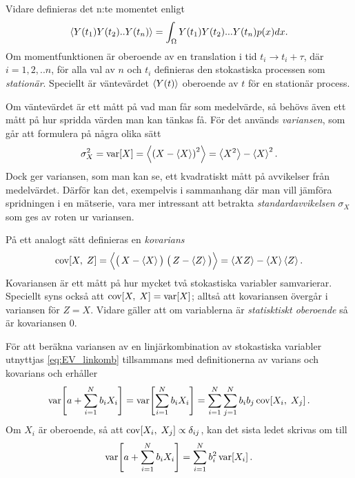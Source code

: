 Vidare definieras det n:te momentet enligt 
\begin{equation}
    \ev{Y(t_1)Y(t_2)..Y(t_n)} = \int_{\Omega} Y(t_1)Y(t_2)...Y(t_n)p(x)dx.
\end{equation}
Om momentfunktionen är oberoende av en translation i tid $t_i\to t_i+\tau$, där $i=1,2,..n$, för alla val av $n$ och $t_i$ definieras den stokastiska processen som \emph{stationär}. Speciellt är väntevärdet $\ev{Y(t)}$ oberoende av $t$ för en stationär process. 

Om väntevärdet är ett mått på vad man får som medelvärde, så behövs
även ett mått på hur spridda värden man kan tänkas få. För det används
\emph{variansen}, som går att formulera på några olika sätt~\cite{Rice_matstat2006}
\begin{equation}\label{eq:VAR}
\sigma_X^2=\VAR{X} = \ev{\left(X-\ev{X} \right)^2} = \ev{X^2}-\ev{X}^2.
\end{equation}
Dock ger variansen, som man kan se, ett kvadratiskt mått på
avvikelser från medelvärdet. Därför kan det, exempelvis i sammanhang
där man vill jämföra spridningen i en mätserie, vara mer intressant
att betrakta \emph{standardavvikelsen} $\sigma_X$ som ges av roten ur
variansen.


På ett analogt sätt definieras en \emph{kovarians}~\cite{Rice_matstat2006}
\begin{equation}\label{eq:COV}
\COV{X}{Z} 
= \Big\langle \big(\, X-\ev{X}\big)\;\big(\, Z-\ev{Z}\big) \Big\rangle
= \ev{XZ}-\ev{X}\ev{Z}.
\end{equation}
Kovariansen är ett mått på hur mycket två stokastiska variabler
samvarierar. Speciellt syns också att $\text{cov}\!\left[X,\;X\right]=\text{var}\!\left[X\right]$; alltså att
kovariansen övergår i variansen för $Z=X$. Vidare gäller att om
variablerna är \emph{statisktiskt oberoende} så är kovariansen 0.

För att beräkna variansen av en linjärkombination av stokastiska variabler utnyttjas \eqref{eq:EV_linkomb} tillsammans med definitionerna av varians och kovarians och erhåller
\begin{equation}
\text{var}\!\left[a+\sum_{i=1}^N b_i X_i\right] = \text{var}\!\left[\sum_{i=1}^N b_i X_i\right] 
= \sum_{i=1}^N\sum_{j=1}^N b_i b_j\, \text{cov}\!\left[X_i,\;X_j\right].
\end{equation}
Om $X_i$ är oberoende, så att $\text{cov}\!\left[X_i,\;X_j\right]\propto\delta_{ij}$, kan det sista ledet skrivas om till
\begin{equation}\label{eq:VAR_linkomb}
\text{var}\!\left[a+\sum_{i=1}^N b_i X_i\right] = \sum_{i=1}^N b_i^2\, \text{var}\!\left[X_i\right].
\end{equation}




